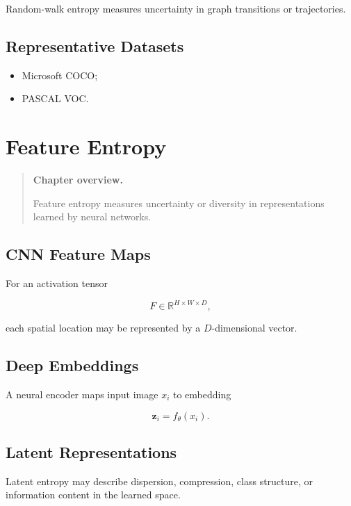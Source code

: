 \documentclass[11pt,oneside]{book}
\theoremstyle{remark}
\newcommand{\R}{\mathbb{R}}
\newenvironment{chapteroverview}
{
	\begin{quote}
		\small
		\textbf{Chapter overview.}
	}
	{
	\end{quote}
}
\newenvironment{datasetlist}
{
	\begin{itemize}[label=\(\triangleright\)]
	}
	{
	\end{itemize}
}
\begin{document}
	Random-walk entropy measures uncertainty in graph transitions or trajectories.
	
	\section*{Representative Datasets}
	
	\begin{datasetlist}
		\item Microsoft COCO;
		\item PASCAL VOC.
	\end{datasetlist}
	
	
	\chapter{Feature Entropy}
	\label{chap:feature-entropy}
	
	\begin{chapteroverview}
		Feature entropy measures uncertainty or diversity in representations learned
		by neural networks.
	\end{chapteroverview}
	
	\section{CNN Feature Maps}
	
	For an activation tensor
	
	\[
	F\in\R^{H\times W\times D},
	\]
	
	each spatial location may be represented by a \(D\)-dimensional vector.
	
	\section{Deep Embeddings}
	
	A neural encoder maps input image \(x_i\) to embedding
	
	\[
	\bm{z}_i=f_{\theta}(x_i).
	\]
	
	\section{Latent Representations}
	
	Latent entropy may describe dispersion, compression, class structure,
	or information content in the learned space.
	
\end{document}
